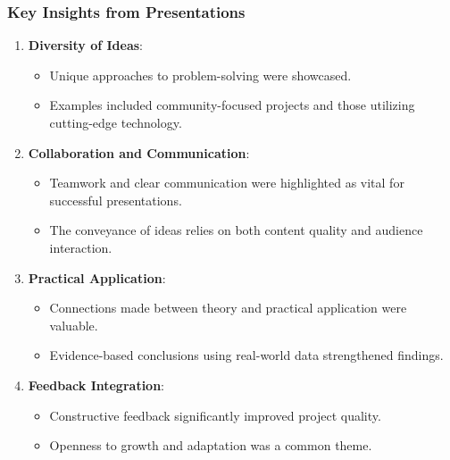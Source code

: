 \documentclass[aspectratio=169]{beamer}
\begin{document}
\begin{frame}[fragile]
    \frametitle{Key Insights from Presentations}
    \begin{enumerate}
        \item \textbf{Diversity of Ideas}:
        \begin{itemize}
            \item Unique approaches to problem-solving were showcased.
            \item Examples included community-focused projects and those utilizing cutting-edge technology.
        \end{itemize}
        
        \item \textbf{Collaboration and Communication}:
        \begin{itemize}
            \item Teamwork and clear communication were highlighted as vital for successful presentations.
            \item The conveyance of ideas relies on both content quality and audience interaction.
        \end{itemize}
        
        \item \textbf{Practical Application}:
        \begin{itemize}
            \item Connections made between theory and practical application were valuable.
            \item Evidence-based conclusions using real-world data strengthened findings.
        \end{itemize}
        
        \item \textbf{Feedback Integration}:
        \begin{itemize}
            \item Constructive feedback significantly improved project quality.
            \item Openness to growth and adaptation was a common theme.
        \end{itemize}
    \end{enumerate}
\end{frame}
\end{document}

